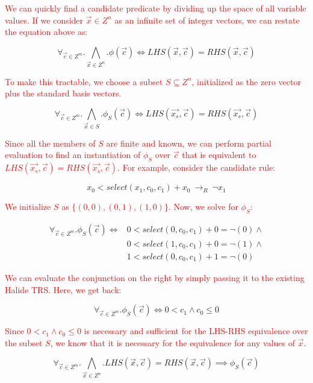 \documentclass[acmsmall,review]{acmart}\settopmatter{printfolios=true,printccs=false,printacmref=false}
\newcommand{\modified}[1]{\textcolor{red}{{#1}}}
\newcommand{\rewrites}[0]{\:\rightarrow_{R}\:}
\begin{document}
\modified{We can quickly find a candidate predicate by dividing up the space of all variable values. 
If we consider $\vec{x} \in Z^n$ as an infinite set of integer vectors, we can restate 
the equation above as:}

\[ \forall_{\vec{c} \in Z^m} . \bigwedge\limits_{\vec{x} \in Z^n} . \phi(\vec{c}) \iff LHS(\vec{x}, \vec{c}) = RHS(\vec{x}, \vec{c})
\]

\modified{To make this tractable, we choose a subset $S \subseteq Z^n$, initialized as the zero
vector plus the standard basis vectors.}

\[ \forall_{\vec{c} \in Z^m} . \bigwedge\limits_{\vec{x} \in S} . \phi_S(\vec{c}) \iff LHS(\vec{x_s}, \vec{c}) = RHS(\vec{x_s}, \vec{c})
\]

\modified{Since all the members of $S$ are finite and known, we can perform partial evaluation to
find an instantiation of $\phi_S$ over $\vec{c}$ that is equivalent to $LHS(\vec{x_s}, \vec{c}) = RHS(\vec{x_s}, \vec{c})$.
For example, consider the candidate rule:}

\[ x_0 < select(x_1, c_0, c_1) + x_0 \rewrites \neg x_1
\]

\modified{We initialize $S$ as $\{(0,0), (0,1), (1,0)\}$. Now, we solve for $\phi_S$:}

\begin{equation*}
\begin{split}
 \forall_{\vec{c} \in Z^m} . \phi_S(\vec{c}) \iff &  0 < select(0, c_0, c_1) + 0 = \neg(0) \wedge \\
                                                   & 0 < select(1, c_0, c_1) + 0 = \neg(1) \wedge \\
                                                   & 1 < select(0, c_0, c_1) + 1 = \neg(0)
\end{split}
\end{equation*}

\modified{We can evaluate the conjunction on the right by simply passing it to the existing Halide TRS. 
Here, we get back:}

\[  \forall_{\vec{c} \in Z^m} . \phi_S(\vec{c}) \iff 0 < c_1 \wedge c_0 \le 0
\]

\modified{Since $0 < c_1 \wedge c_0 \le 0$ is necessary and sufficient for the LHS-RHS equivalence 
over the subset $S$, we know that it is necessary for the equivalence for any values of $\vec{x}$.}

\[ \forall_{\vec{c} \in Z^m} . \bigwedge\limits_{\vec{x} \in Z^n} . LHS(\vec{x},\vec{c}) = RHS(\vec{x}, \vec{c}) \implies \phi_S(\vec{c})
\]
\end{document}

